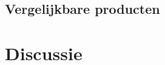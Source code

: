 \documentclass[oneside, a4paper, openany]{memoir}
\begin{document}
\section{Vergelijkbare producten}

\chapter{Discussie}


\backmatter
\printbibliography




\end{document}
